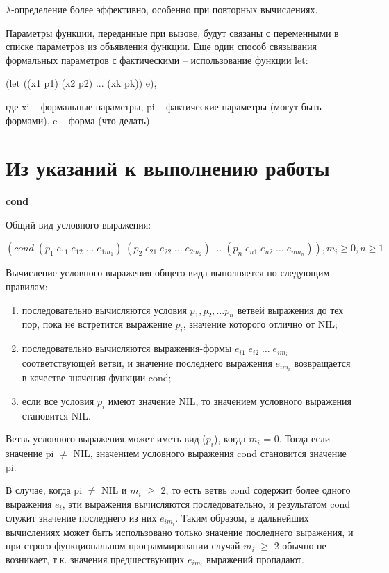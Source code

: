\documentclass[12pt]{report}
\begin{document}
$\lambda$-определение более эффективно, особенно при повторных вычислениях. 

Параметры функции, переданные при вызове, будут связаны с переменными в списке параметров из объявления функции. Еще один способ связывания формальных параметров с фактическими -- использование функции let:

(let ((x1 p1) (x2 p2) ... (xk pk))  e),

где xi -- формальные параметры, pi -- фактические параметры (могут быть формами), e -- форма (что делать).

\clearpage
\section*{Из указаний к выполнению работы}

\textbf{cond}

Общий вид условного выражения:

$(cond \; (p_1  \; e_{11}  \;  e_{12}  \;  …  \;  e_{1m_1})  \;  (p_2  \;  e_{21} \;  e_{22}  \;  …  \;  e_{2m_2})  \;  …  \;  (p_n  \; e_{n1} \;  e_{n2} \;  …  \; e_{nm_n})), m_i \geqslant 0 , n \geqslant 1$

Вычисление условного выражения общего вида выполняется по  следующим правилам:

\begin{enumerate}
	\item последовательно вычисляются условия $p_1, p_2, … p_n$ ветвей выражения до тех пор, пока не встретится выражение $p_i$, значение   которого отлично от NIL;
	\item последовательно вычисляются выражения-формы $e_{i1} \;  e_{i2} \;  … \;  e_{im_i}$ соответствующей ветви, и значение последнего выражения $e_{im_i}$ возвращается в качестве значения функции cond;
	\item если все условия $p_i$ имеют значение NIL, то значением условного выражения становится NIL.
\end{enumerate}

Ветвь условного выражения может иметь вид ($p_i$), когда $m_i$ = 0. Тогда если значение pi $\neq$ NIL, значением условного выражения cond становится значение pi.

В случае, когда pi $\neq$ NIL и $m_i$ $\geqslant$ 2, то есть ветвь cond содержит более  одного выражения $e_i$, эти выражения вычисляются последовательно, и  результатом cond служит значение последнего из них $e_{im_i}$. Таким  образом, в дальнейших вычислениях может быть использовано только значение последнего выражения, и при строго функциональном  программировании случай $m_i$ $\geqslant$ 2 обычно не возникает, т.к. значения  предшествующих $e_{im_i}$ выражений пропадают. 
\end{document}
